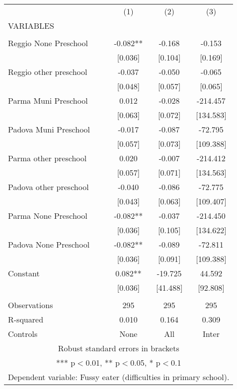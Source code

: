 \begin{tabular}{lccc} \hline
 & (1) & (2) & (3) \\
VARIABLES &  &  &  \\ \hline
 &  &  &  \\
Reggio None Preschool & -0.082** & -0.168 & -0.153 \\
 & [0.036] & [0.104] & [0.169] \\
Reggio other preschool & -0.037 & -0.050 & -0.065 \\
 & [0.048] & [0.057] & [0.065] \\
Parma Muni Preschool & 0.012 & -0.028 & -214.457 \\
 & [0.063] & [0.072] & [134.583] \\
Padova Muni Preschool & -0.017 & -0.087 & -72.795 \\
 & [0.057] & [0.073] & [109.388] \\
Parma other preschool & 0.020 & -0.007 & -214.412 \\
 & [0.057] & [0.071] & [134.563] \\
Padova other preschool & -0.040 & -0.086 & -72.775 \\
 & [0.043] & [0.063] & [109.407] \\
Parma None Preschool & -0.082** & -0.037 & -214.450 \\
 & [0.036] & [0.105] & [134.622] \\
Padova None Preschool & -0.082** & -0.089 & -72.811 \\
 & [0.036] & [0.091] & [109.388] \\
Constant & 0.082** & -19.725 & 44.592 \\
 & [0.036] & [41.488] & [92.808] \\
 &  &  &  \\
Observations & 295 & 295 & 295 \\
R-squared & 0.010 & 0.164 & 0.309 \\
 Controls & None & All & Inter \\ \hline
\multicolumn{4}{c}{ Robust standard errors in brackets} \\
\multicolumn{4}{c}{ *** p$<$0.01, ** p$<$0.05, * p$<$0.1} \\
\multicolumn{4}{c}{ Dependent variable: Fussy eater (difficulties in primary school).} \\
\end{tabular}
